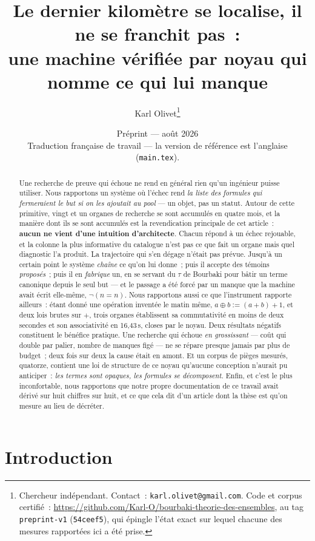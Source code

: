 \documentclass[11pt]{article}
\title{Le dernier kilomètre se localise, il ne se franchit pas~:\\
une machine vérifiée par noyau qui nomme ce qui lui manque}
\author{Karl Olivet\thanks{Chercheur indépendant. Contact~:
\texttt{karl.olivet@gmail.com}. Code et corpus certifié~:
\url{https://github.com/Karl-O/bourbaki-theorie-des-ensembles}, au tag
\texttt{preprint-v1} (\texttt{54ceef5}), qui épingle l'état exact sur lequel chacune des
mesures rapportées ici a été prise.}}
\date{Préprint --- août 2026\\
{\small Traduction française de travail --- la version de référence est l'anglaise (\texttt{main.tex}).}}
\theoremstyle{remark}\newtheorem{remarque}{Remarque}
\begin{document}
\maketitle

\begin{abstract}
Une recherche de preuve qui échoue ne rend en général rien qu'un ingénieur puisse
utiliser. Nous rapportons un système où l'échec rend \emph{la liste des formules qui
fermeraient le but si on les ajoutait au pool} --- un objet, pas un statut. Autour de
cette primitive, vingt et un organes de recherche se sont accumulés en quatre mois, et
la manière dont ils se sont accumulés est la revendication principale de cet article~:
\textbf{aucun ne vient d'une intuition d'architecte}. Chacun répond à un échec
rejouable, et la colonne la plus informative du catalogue n'est pas ce que fait un
organe mais quel diagnostic l'a produit. La trajectoire qui s'en dégage n'était pas
prévue. Jusqu'à un certain point le système \emph{chaîne} ce qu'on lui donne~; puis il
accepte des témoins \emph{proposés}~; puis il en \emph{fabrique} un, en se servant du
$\tau$ de Bourbaki pour bâtir un terme canonique depuis le seul but --- et le passage a
été forcé par un manque que la machine avait écrit elle-même, $\neg(n = n)$. Nous
rapportons aussi ce que l'instrument rapporte ailleurs~: étant donné une opération
inventée le matin même, $a \oplus b := (a+b)+1$, et deux lois brutes sur $+$, trois
organes établissent sa commutativité en moins de deux secondes et son associativité en
16,43\,s, closes par le noyau. Deux résultats négatifs constituent le bénéfice pratique.
Une recherche qui échoue \emph{en grossissant} --- coût qui double par palier, nombre de
manques figé --- ne se répare presque jamais par plus de budget~; deux fois sur deux la
cause était en amont. Et un corpus de pièges mesurés, quatorze, contient une loi de
structure de ce noyau qu'aucune conception n'aurait pu anticiper~: \emph{les termes sont
opaques, les formules se décomposent}. Enfin, et c'est le plus inconfortable, nous
rapportons que notre propre documentation de ce travail avait dérivé sur huit chiffres
sur huit, et ce que cela dit d'un article dont la thèse est qu'on mesure au lieu de
décréter.
\end{abstract}

\section{Introduction}
\label{sec:intro}
\end{document}
